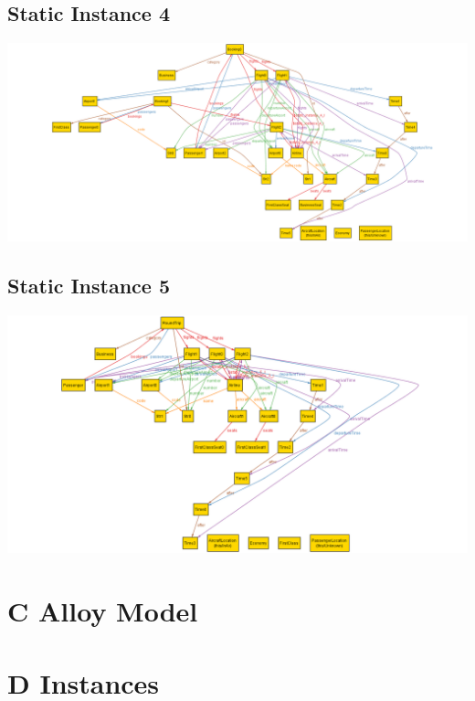 \documentclass[12pt,a4paper,titlepage]{article}
\begin{document}
\subsection{Static Instance 4}
\includegraphics[width=\textwidth]{static_instance_4}
\subsection{Static Instance 5}
\includegraphics[width=\textwidth]{static_instance_5}

\section {C Alloy Model}


\section{D Instances}
\end{document}
